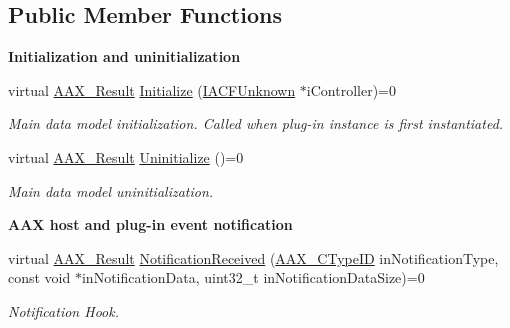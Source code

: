 \subsection*{Public Member Functions}
\begin{Indent}{\bf Initialization and uninitialization}\par
\begin{DoxyCompactItemize}
\item 
virtual \hyperlink{a00149_a4d8f69a697df7f70c3a8e9b8ee130d2f}{A\+A\+X\+\_\+\+Result} \hyperlink{a00061_ad4db3c0ab67f8f41cdd042a915daabb4}{Initialize} (\hyperlink{a00146}{I\+A\+C\+F\+Unknown} $\ast$i\+Controller)=0
\begin{DoxyCompactList}\small\item\em Main data model initialization. Called when plug-\/in instance is first instantiated. \end{DoxyCompactList}\item 
virtual \hyperlink{a00149_a4d8f69a697df7f70c3a8e9b8ee130d2f}{A\+A\+X\+\_\+\+Result} \hyperlink{a00061_a711969adc95624fb9ac8a3e3b2c23696}{Uninitialize} ()=0
\begin{DoxyCompactList}\small\item\em Main data model uninitialization. \end{DoxyCompactList}\end{DoxyCompactItemize}
\end{Indent}
\begin{Indent}{\bf A\+A\+X host and plug-\/in event notification}\par
\begin{DoxyCompactItemize}
\item 
virtual \hyperlink{a00149_a4d8f69a697df7f70c3a8e9b8ee130d2f}{A\+A\+X\+\_\+\+Result} \hyperlink{a00061_aa3eaeb292d2ca84086a5a058171994fd}{Notification\+Received} (\hyperlink{a00149_ac678f9c1fbcc26315d209f71a147a175}{A\+A\+X\+\_\+\+C\+Type\+I\+D} in\+Notification\+Type, const void $\ast$in\+Notification\+Data, uint32\+\_\+t in\+Notification\+Data\+Size)=0
\begin{DoxyCompactList}\small\item\em Notification Hook. \end{DoxyCompactList}\end{DoxyCompactItemize}
\end{Indent}
